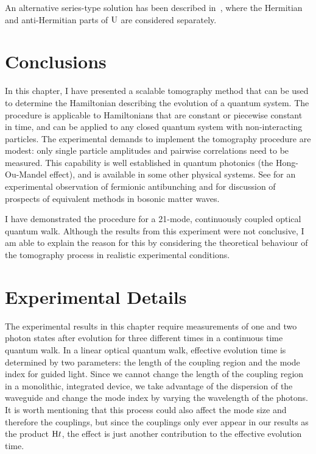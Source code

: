 An alternative series-type solution has been described in~\cite{hamiltomo-ulm},
where the Hermitian and anti-Hermitian parts of \(\mathrm{U}\) are considered
separately.

\section{Conclusions}
In this chapter, I have presented a scalable tomography method that can be used
to determine the Hamiltonian describing the evolution of a quantum system.
The procedure is applicable to Hamiltonians that are constant or piecewise
constant in time, and can be applied to any closed quantum system with
non-interacting particles. The experimental demands to implement the
tomography procedure are modest: only single particle amplitudes  and pairwise
correlations need to be measured. This capability is well established in quantum
photonics (the Hong-Ou-Mandel effect), and is available in some other physical
systems. See \cite{fermion-antibunching} for an experimental observation of
fermionic antibunching and \cite{hom-matter} for discussion of prospects of
equivalent methods in bosonic matter waves.

I have demonstrated the procedure for a 21-mode,
continuously coupled optical quantum walk. Although the results from this
experiment were not conclusive, I am able to explain the reason for this by
considering the theoretical behaviour of the tomography process in realistic
experimental conditions. 

\section{Experimental Details}
\label{sec:HamiltomoExperiment}
The experimental results in this chapter require measurements of one and two
photon states after evolution for three different times in a continuous time
quantum walk. In a linear optical quantum walk, effective evolution time is
determined by two parameters: the length of the coupling region and the mode
index for guided light. Since we cannot change the length of the coupling region
in a monolithic, integrated device, we take advantage of the dispersion of the
waveguide and change the mode index by varying the wavelength of the photons.
It is worth mentioning that this process could also affect the mode size and
therefore the couplings, but since the couplings only ever appear in our results
as the product \(\mathrm{H}t\), the effect is just another contribution to the
effective evolution time.


